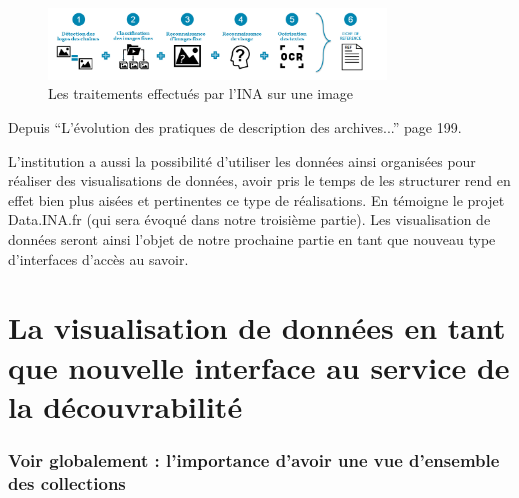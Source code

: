 \begin{figure}[h!]
	\centering
	\includegraphics[width=0.8\textwidth]{images/image11.png}
	\caption{Les traitements effectués par l'INA sur une image}
	\label{fig:image11}
\end{figure}


\begin{center}
	Depuis \enquote{L'évolution des pratiques de description des archives...} page 199. 
\end{center}

L’institution a aussi la possibilité d'utiliser les données ainsi organisées pour réaliser des visualisations de données, avoir pris le temps de les structurer rend en effet bien plus aisées et pertinentes ce type de réalisations. En témoigne le projet Data.INA.fr (qui sera évoqué dans notre troisième partie). Les visualisation de données seront ainsi l’objet de notre prochaine partie en tant que nouveau type d'interfaces d'accès au savoir.

\chapter{La visualisation de données en tant que nouvelle interface au service de la découvrabilité}

\subsection{Voir globalement : l'importance d'avoir une vue d'ensemble des collections}


